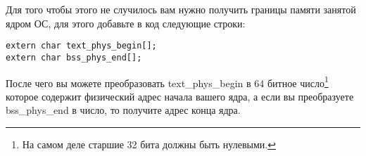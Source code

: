 Для того чтобы этого не случилось вам нужно получить границы памяти занятой
ядром ОС, для этого добавьте в код следующие строки:

\begin{lstlisting}
extern char text_phys_begin[];
extern char bss_phys_end[];
\end{lstlisting}

После чего вы можете преобразовать text\_phys\_begin в 64 битное число\footnote{
На самом деле старшие 32 бита должны быть нулевыми.} которое содержит физический
адрес начала вашего ядра, а если вы преобразуете bss\_phys\_end в число, то
получите адрес конца ядра.
